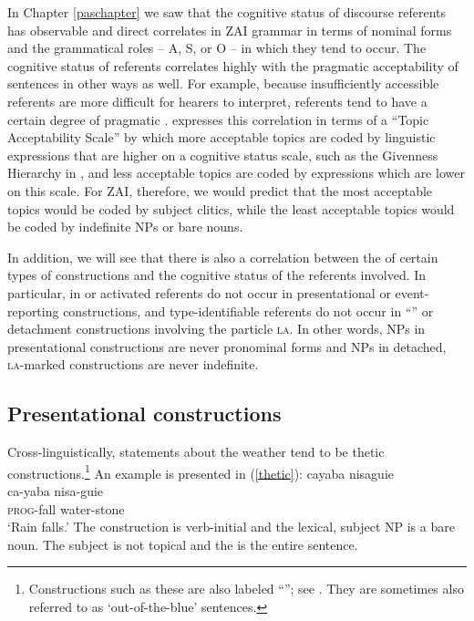 In Chapter \ref{paschapter} we saw that the cognitive status of discourse referents has observable and direct correlates in ZAI grammar in terms of nominal forms and the grammatical roles -- A, S, or O -- in which they tend to occur. The cognitive status of referents correlates highly with the pragmatic acceptability of sentences in other ways as well. For example, because insufficiently accessible  referents are more difficult for hearers to interpret,  referents tend to have a certain degree of pragmatic . \citet[165]{lambrecht1994} expresses this correlation in terms of a ``Topic Acceptability Scale'' by which more acceptable topics are coded by linguistic expressions that are higher on a cognitive status scale, such as the Givenness Hierarchy in , and less acceptable topics are coded by expressions which are lower on this scale. For ZAI, therefore, we would predict that the most acceptable topics would be coded by subject clitics, while the least acceptable topics would be coded by indefinite NPs or bare nouns.

In addition, we will see that there is also a correlation between the  of certain types of constructions and the cognitive status of the  referents involved. In particular, in  or activated referents do not occur in presentational or event-reporting constructions, and type-identifiable referents do not occur in ``'' or detachment constructions involving the particle \textsc{la}. In other words, NPs in presentational constructions are never pronominal forms and NPs in detached, \textsc{la}-marked constructions are never indefinite. 



\subsection{Presentational constructions}\label{presentationalsection}

Cross-linguistically, statements about the weather tend to be thetic constructions.\footnote{Constructions such as these are also labeled ``''; see . They are sometimes also referred to as `out-of-the-blue' sentences.} An example is presented in (\ref{thetic}):
\ea\label{thetic} 
\glll cayaba nisaguie \\
ca-yaba nisa-guie \\
\textsc{prog}-fall water-stone  \\
\glt `Rain falls.' 
\z
The construction is verb-initial and the lexical, subject NP is a bare noun. The subject is not topical and the  is the entire sentence.

